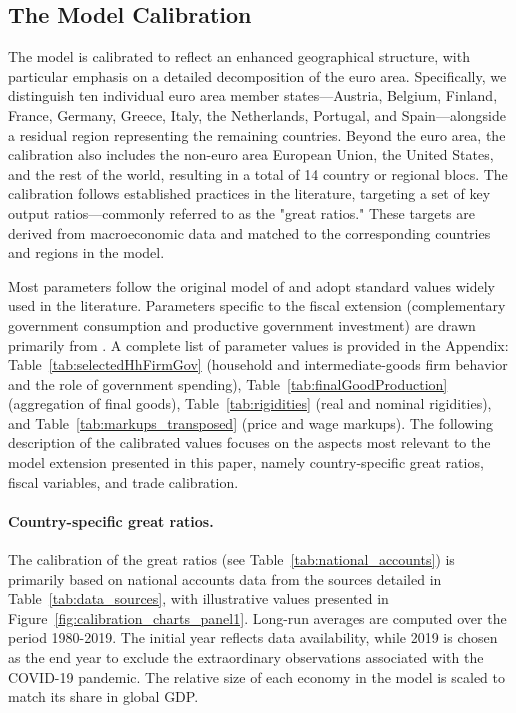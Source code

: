 \documentclass[a4paper,11pt]{article}
\numberwithin{equation}{section}
\begin{document}

\subsection{The Model Calibration} \label{sec:model_calibration}

The model is calibrated to reflect an enhanced geographical structure, with particular emphasis on a detailed decomposition of the euro area.
Specifically, we distinguish ten individual euro area member states---Austria, Belgium, Finland, France, Germany, Greece, Italy, the Netherlands, Portugal, and Spain---alongside a residual region representing the remaining countries.
Beyond the euro area, the calibration also includes the non-euro area European Union, the United States, and the rest of the world, resulting in a total of 14 country or regional blocs.
The calibration follows established practices in the literature, targeting a set of key output ratios---commonly referred to as the "great ratios." These targets are derived from macroeconomic data and matched to the corresponding countries and regions in the model.

Most parameters follow the original model of \citet{GomesEtAl2010ecbwp} and adopt standard values widely used in the literature.
Parameters specific to the fiscal extension (complementary government consumption and productive government investment) are drawn primarily from \citet{Clancyetal2016}.
A complete list of parameter values is provided in the Appendix: Table~\ref{tab:selectedHhFirmGov} (household and intermediate-goods firm behavior and the role of government spending), Table~\ref{tab:finalGoodProduction} (aggregation of final goods), Table~\ref{tab:rigidities} (real and nominal rigidities), and Table~\ref{tab:markups_transposed} (price and wage markups).
The following description of the calibrated values focuses on the aspects most relevant to the model extension presented in this paper, namely country-specific great ratios, fiscal variables, and trade calibration.


\paragraph{Country-specific great ratios.}
The calibration of the great ratios (see Table~\ref{tab:national_accounts}) is primarily based on national accounts data from the sources detailed in Table~\ref{tab:data_sources}, with illustrative values presented in Figure~\ref{fig:calibration_charts_panel1}.
Long-run averages are computed over the period 1980-2019.
The initial year reflects data availability, while 2019 is chosen as the end year to exclude the extraordinary observations associated with the COVID-19 pandemic.
The relative size of each economy in the model is scaled to match its share in global GDP.
\end{document}
